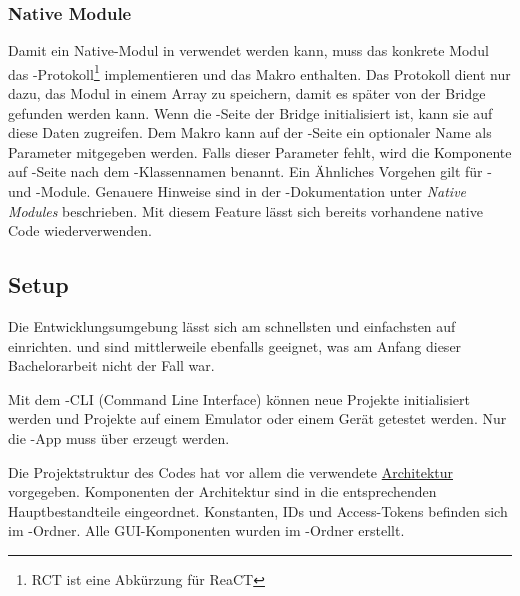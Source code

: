 \subsubsection{Native Module}
Damit ein  Native-Modul in  verwendet werden kann, muss das konkrete Modul das \newline{}-Protokoll\footnote{RCT ist eine Abkürzung für ReaCT} implementieren und das Makro \newline{} enthalten. 
Das Protokoll dient nur dazu, das Modul in einem Array zu speichern, damit es später von der Bridge gefunden werden kann. 
Wenn die -Seite der Bridge initialisiert ist, kann sie auf diese Daten zugreifen. 
Dem Makro kann auf der -Seite ein optionaler Name als Parameter mitgegeben werden. 
Falls dieser Parameter fehlt, wird die Komponente auf -Seite nach dem -Klassennamen benannt. 
Ein Ähnliches Vorgehen gilt für - und -Module. 
Genauere Hinweise sind in der -Dokumentation unter \textit{Native Modules} beschrieben.\cite{react-native-module-ios}\cite{react-native-module-android}
Mit diesem Feature lässt sich bereits vorhandene native Code wiederverwenden. 


\subsection{Setup}
Die Entwicklungsumgebung lässt sich am schnellsten und einfachsten auf  einrichten. 
 und  sind mittlerweile ebenfalls geeignet, was am Anfang dieser Bachelorarbeit nicht der Fall war. 

Mit dem -CLI (Command Line Interface) können neue Projekte initialisiert werden und Projekte auf einem Emulator oder einem Gerät getestet werden. 
Nur die -App muss über  erzeugt werden. 

Die Projektstruktur des  Codes hat vor allem die verwendete \hyperref[pd-architektur]{Architektur} vorgegeben. 
Komponenten der Architektur sind in die entsprechenden Hauptbestandteile eingeordnet. 
Konstanten, IDs und Access-Tokens befinden sich im -Ordner. 
Alle \gls{GUI}-Komponenten wurden im -Ordner erstellt. 


